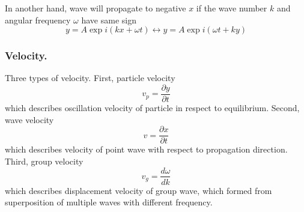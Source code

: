 \documentclass[../../../main.tex]{subfiles}
\begin{document}
In another hand, wave will propagate to negative $x$ if the wave number $k$ and angular frequency $\omega$ have same sign
\begin{equation*}
    y=A\exp i (kx+\omega t)\longleftrightarrow y=A\exp i (\omega t+ky)
\end{equation*}

\subsubsection*{Velocity.} Three types of velocity. First, particle velocity
\begin{equation*}
    v_p=\frac{\partial y}{\partial t}
\end{equation*}
which describes oscillation velocity of particle in respect to equilibrium. Second, wave velocity
\begin{equation*}
    v=\frac{\partial x}{\partial t}
\end{equation*}
which describes velocity of point wave with respect to propagation direction. Third, group velocity
\begin{equation*}
    v_g=\frac{d\omega}{d k}
\end{equation*}
which describes displacement velocity of group wave, which formed from superposition of multiple waves with different frequency. 
\end{document}
